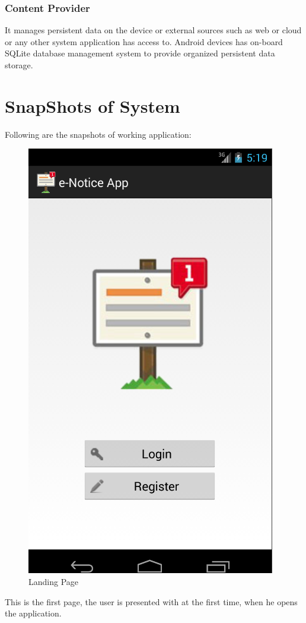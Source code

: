 \subsubsection{Content Provider}
It manages persistent data on the device or external sources such as web or cloud or any other system application has access to.
Android devices has on-board SQLite database management system to provide organized persistent data storage.
\pagebreak
\section{SnapShots of System}
Following are the snapshots of working application:
\begin{figure}[H]
\centering \includegraphics[scale=0.7]{image/landing.png}
\caption{Landing Page}
\end{figure}
This is the first page, the user is presented with at the first time, when he opens the application.

